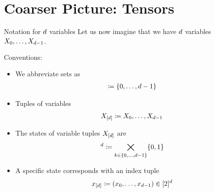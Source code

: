 \documentclass{beamer}
\begin{document}
    \section{Coarser Picture: Tensors}

    \begin{frame}{Notation for $d$ variables}
        Let us now imagine that we have $d$ variables $X_{0},\ldots,X_{d-1}$.\\
        \medskip

        Conventions:
        \begin{itemize}
            \item We abbreviate sets as
            \begin{align*}
                [\catorder]
                \coloneqq \{0,\ldots,\catorder-1\}
            \end{align*}
            \item Tuples of variables
            \begin{align*}
                X_{[d]} \coloneqq X_{0},\ldots,X_{d-1}
            \end{align*}
            \item The states of variable tuples $X_{[d]}$ are
            \begin{align*}
                [2]
                ^{\catorder} \coloneqq \bigtimes_{\catenumerator\in\{0,\ldots,\catorder-1\}} \{0,1\}
            \end{align*}
            \item A specific state corresponds with an index tuple
            \begin{align*}
                x_{[d]} \coloneqq (x_{0},\ldots,x_{d-1}) \in  [2]^{d}
            \end{align*}
        \end{itemize}
    \end{frame}
\end{document}
